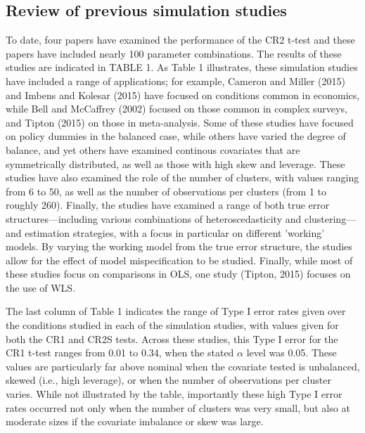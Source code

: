 \documentclass[12pt]{article}\usepackage[]{graphicx}\usepackage[]{color}
\begin{document}
\subsection{Review of previous simulation studies}
To date, four papers have examined the performance of the CR2 t-test and these papers have included nearly 100 parameter combinations. 
The results of these studies are indicated in TABLE 1. 
As Table 1 illustrates, these simulation studies have included a range of applications; for example, Cameron and Miller (2015) and Imbens and Kolesar (2015) have focused on conditions common in economics, while Bell and McCaffrey (2002) focused on those common in complex surveys, and Tipton (2015) on those in meta-analysis. 
Some of these studies have focused on policy dummies in the balanced case, while others have varied the degree of balance, and yet others have examined continous covariates that are symmetrically distributed, as well as those with high skew and leverage.
These studies have also examined the role of the number of clusters, with values ranging from 6 to 50, as well as the number of observations per clusters (from 1 to roughly 260).
Finally, the studies have examined a range of both true error structures---including various combinations of heteroscedasticity and clustering---and estimation strategies, with a focus in particular on different 'working' models. 
By varying the working model from the true error structure, the studies allow for the effect of model mispecification to be studied.
Finally, while most of these studies focus on comparisons in OLS, one study (Tipton, 2015) focuses on the use of WLS.

The last column of Table 1 indicates the range of Type I error rates given over the conditions studied in each of the simulation studies, with values given for both the CR1 and CR2S tests.
Across these studies, this Type I error for the CR1 t-test ranges from 0.01 to 0.34, when the stated $\alpha$ level was 0.05. 
These values are particularly far above nominal when the covariate tested is unbalanced, skewed (i.e., high leverage), or when the number of observations per cluster varies. 
While not illustrated by the table, importantly these high Type I error rates occurred not only when the number of clusters was very small, but also at moderate sizes if the covariate imbalance or skew was large. 
\end{document}
